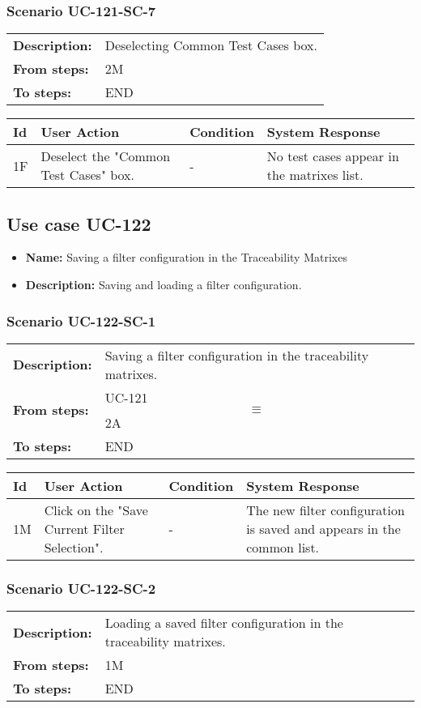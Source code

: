 \documentclass[a4paper,11pt]{article}
\newcommand{\bl}{\\ \hline}
\begin{document}
\subsubsection*{Scenario UC-121-SC-7}
\begin{tabular}{p{1in}p{4in}}
{\bf Description:} & Deselecting Common Test Cases box. \\
{\bf From steps:} & 2M \\
{\bf To steps:} & END \\
\end{tabular}
 
\begin{tabular}{|p{0.8in}|p{1.6in}|p{1.6in}|p{1.6in}|}
\hline
Id & User Action & Condition & System Response  \bl 
1F & Deselect the "Common Test Cases" box. & - & No test cases appear in the matrixes list. \bl 
\end{tabular}
\subsection*{Use case UC-122}
\begin{itemize}
\item {\bf Name: }Saving a filter configuration in the Traceability Matrixes
\item {\bf Description: }Saving and loading a filter configuration.
\end{itemize}
\subsubsection*{Scenario UC-122-SC-1}
\begin{tabular}{p{1in}p{4in}}
{\bf Description:} & Saving a filter configuration in the traceability matrixes. \\
{\bf From steps:} & UC-121$$\equiv$$2A \\
{\bf To steps:} & END \\
\end{tabular}
 
\begin{tabular}{|p{0.8in}|p{1.6in}|p{1.6in}|p{1.6in}|}
\hline
Id & User Action & Condition & System Response  \bl 
1M & Click on the "Save Current Filter Selection". & - & The new filter configuration is saved and appears in the common list. \bl 
\end{tabular}
\subsubsection*{Scenario UC-122-SC-2}
\begin{tabular}{p{1in}p{4in}}
{\bf Description:} & Loading a saved filter configuration in the traceability matrixes. \\
{\bf From steps:} & 1M \\
{\bf To steps:} & END \\
\end{tabular}
 
\end{document}
